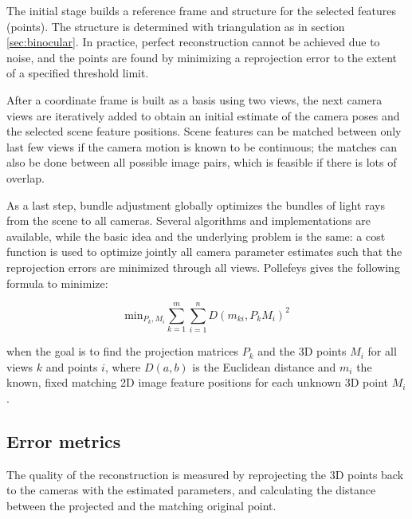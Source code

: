 The initial stage builds a reference frame and structure for the selected features (points).
The structure is determined with triangulation as in section \ref{sec:binocular}.
In practice, perfect reconstruction cannot be achieved due to noise, and the points are found by minimizing a reprojection error to the extent of a specified threshold limit.

After a coordinate frame is built as a basis using two views, the next camera views are iteratively added to obtain an initial estimate of the camera poses and the selected scene feature positions.
Scene features can be matched between only last few views if the camera motion is known to be continuous;
the matches can also be done between all possible image pairs, which is feasible if there is lots of overlap.

As a last step, bundle adjustment globally optimizes the bundles of light rays from the scene to all cameras.
Several algorithms and implementations are available, while the basic idea and the underlying problem is the same:
a cost function is used to optimize jointly all camera parameter estimates such that the reprojection errors are minimized through all views.
Pollefeys \cite{tutorial} gives the following formula to minimize:

\begin{equation}
	\text{min}_{P_k, M_i} \sum_{k=1}^m \sum_{i=1}^n D(m_{ki}, P_k M_i)^2
\end{equation}

when the goal is to find the projection matrices $P_k$ and the 3D points $M_i$ for all views $k$ and points $i$, where $D(a,b)$ is the Euclidean distance and $m_i$ the known, fixed matching 2D image feature positions for each unknown 3D point $M_i$.




\subsection{Error metrics} %

The quality of the reconstruction is measured by reprojecting the 3D points back to the cameras with the estimated parameters, and calculating the distance between the projected and the matching original point. \cite{hartley03multiview}

